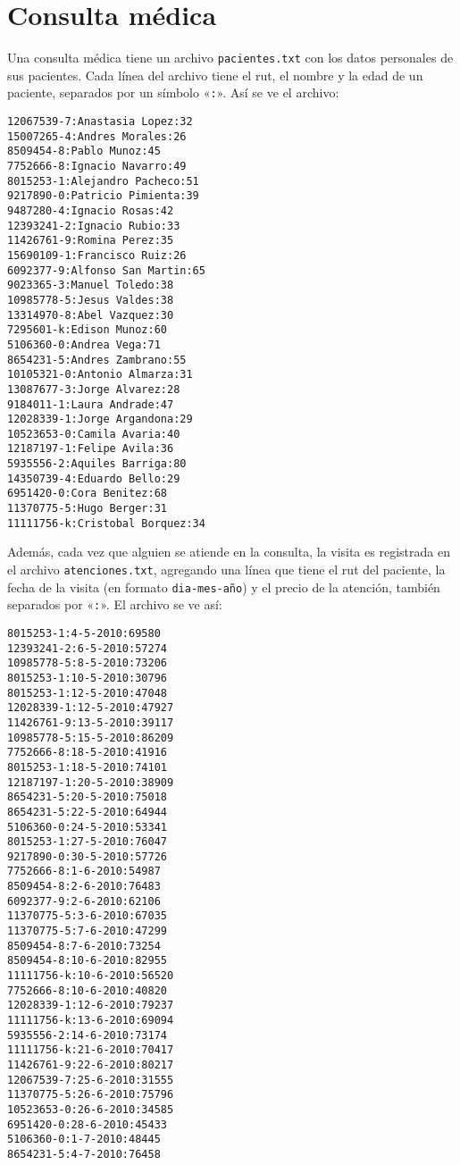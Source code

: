 \section{Consulta médica}

Una consulta médica tiene un archivo \lstinline!pacientes.txt! con los
datos personales de sus pacientes. Cada línea del archivo tiene el rut,
el nombre y la edad de un paciente, separados por un símbolo
«\lstinline!:!». Así se ve el archivo:

\begin{lstlisting}[language=file]
12067539-7:Anastasia Lopez:32
15007265-4:Andres Morales:26
8509454-8:Pablo Munoz:45
7752666-8:Ignacio Navarro:49
8015253-1:Alejandro Pacheco:51
9217890-0:Patricio Pimienta:39
9487280-4:Ignacio Rosas:42
12393241-2:Ignacio Rubio:33
11426761-9:Romina Perez:35
15690109-1:Francisco Ruiz:26
6092377-9:Alfonso San Martin:65
9023365-3:Manuel Toledo:38
10985778-5:Jesus Valdes:38
13314970-8:Abel Vazquez:30
7295601-k:Edison Munoz:60
5106360-0:Andrea Vega:71
8654231-5:Andres Zambrano:55
10105321-0:Antonio Almarza:31
13087677-3:Jorge Alvarez:28
9184011-1:Laura Andrade:47
12028339-1:Jorge Argandona:29
10523653-0:Camila Avaria:40
12187197-1:Felipe Avila:36
5935556-2:Aquiles Barriga:80
14350739-4:Eduardo Bello:29
6951420-0:Cora Benitez:68
11370775-5:Hugo Berger:31
11111756-k:Cristobal Borquez:34
\end{lstlisting}

Además, cada vez que alguien se atiende en la consulta, la visita es
re\-gis\-trada en el archivo \lstinline!atenciones.txt!, agregando una línea
que tiene el rut del paciente, la fecha de la visita (en formato
\texttt{dia-mes-año}) y el precio de la atención, también separados
por «\lstinline!:!». El archivo se ve así:

\begin{lstlisting}[language=file]
8015253-1:4-5-2010:69580
12393241-2:6-5-2010:57274
10985778-5:8-5-2010:73206
8015253-1:10-5-2010:30796
8015253-1:12-5-2010:47048
12028339-1:12-5-2010:47927
11426761-9:13-5-2010:39117
10985778-5:15-5-2010:86209
7752666-8:18-5-2010:41916
8015253-1:18-5-2010:74101
12187197-1:20-5-2010:38909
8654231-5:20-5-2010:75018
8654231-5:22-5-2010:64944
5106360-0:24-5-2010:53341
8015253-1:27-5-2010:76047
9217890-0:30-5-2010:57726
7752666-8:1-6-2010:54987
8509454-8:2-6-2010:76483
6092377-9:2-6-2010:62106
11370775-5:3-6-2010:67035
11370775-5:7-6-2010:47299
8509454-8:7-6-2010:73254
8509454-8:10-6-2010:82955
11111756-k:10-6-2010:56520
7752666-8:10-6-2010:40820
12028339-1:12-6-2010:79237
11111756-k:13-6-2010:69094
5935556-2:14-6-2010:73174
11111756-k:21-6-2010:70417
11426761-9:22-6-2010:80217
12067539-7:25-6-2010:31555
11370775-5:26-6-2010:75796
10523653-0:26-6-2010:34585
6951420-0:28-6-2010:45433
5106360-0:1-7-2010:48445
8654231-5:4-7-2010:76458
\end{lstlisting}

